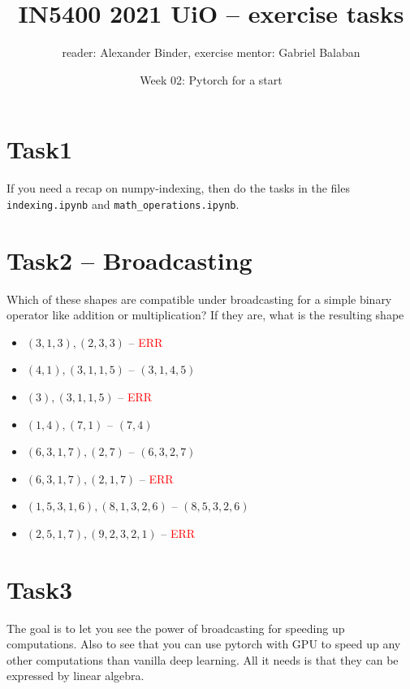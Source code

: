 \documentclass{article}
\title{IN5400 2021 UiO -- exercise tasks }
\author{reader: Alexander Binder, exercise mentor: Gabriel Balaban }
\date{Week 02: Pytorch for a start} %
\newcommand{\bi}[1]{\begin{itemize}#1\end{itemize}}
\newcommand{\s}{ \\\vspace{3mm} }
\begin{document}
\maketitle %

\vspace{0.5cm}



\setlength\parindent{0pt}


\section{Task1}

If you need a recap on numpy-indexing, then do the tasks in the files {\tt indexing.ipynb} and {\tt math\_operations.ipynb}.

\section{Task2 -- Broadcasting}

Which of these shapes are compatible under broadcasting for a simple binary operator like addition or multiplication? If they are, what is the resulting shape

\bi{
\item $(3,1,3), (2,3,3)$ -- \textcolor{red}{ERR}
\item $(4,1), (3,1,1,5)$ -- $(3,1,4,5)$
\item $(3), (3,1,1,5)$ -- \textcolor{red}{ERR}
\item $(1,4),(7,1)$ -- $(7,4)$
\item $(6,3,1,7),(2,7)$ -- $(6,3,2,7)$
\item $(6,3,1,7),(2,1,7)$ -- \textcolor{red}{ERR}
\item $(1,5,3,1,6),(8,1,3,2,6)$ -- $(8,5,3,2,6)$ 
\item $(2,5,1,7),(9,2,3,2,1)$ -- \textcolor{red}{ERR}
}

\section{Task3}


The goal is to let you see the power of broadcasting for speeding up computations. Also to see that you can use pytorch with GPU to speed up any other computations than vanilla deep learning. All it needs is that they can be expressed by linear algebra.\s
\end{document}
